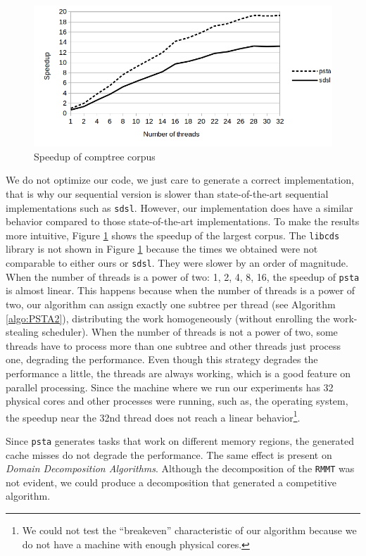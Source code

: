 \begin{figure}[ht]
  \centering
  \includegraphics[scale=0.3]{./images/Speedup.png}
  \caption{Speedup of comptree corpus}
  \label{fig:speedup} 
\end{figure}

We do not optimize our code, we just care to generate a correct
implementation, that is why our sequential version is slower than
state-of-the-art sequential implementations such as
\verb+sdsl+. However, our implementation does have a similar behavior
compared to those state-of-the-art implementations. To make the
results more intuitive, Figure \ref{fig:speedup} shows the speedup of
the largest corpus. The \verb+libcds+ library is not shown in Figure
\ref{fig:speedup} because the times we obtained were not comparable to
either ours or \verb+sdsl+. They were slower by an order of
magnitude. When the number of threads is a power of two: 1, 2, 4, 8,
16, the speedup of \verb+psta+ is almost linear. This happens because
when the number of threads is a power of two, our algorithm can assign
exactly one subtree per thread (see Algorithm \ref{algo:PSTA2}),
distributing the work homogeneously (without enrolling the
work-stealing scheduler). When the number of threads is not a power of
two, some threads have to process more than one subtree and other
threads just process one, degrading the performance. Even though this
strategy degrades the performance a little, the threads are always
working, which is a good feature on parallel processing. Since the
machine where we run our experiments has 32 physical cores and other
processes were running, such as, the operating system, the speedup
near the 32nd thread does not reach a linear behavior\footnote{We
  could not test the ``breakeven'' characteristic of our algorithm
  because we do not have a machine with enough physical cores.}. 


Since {\tt psta} generates tasks that work on different memory
regions, the generated cache misses  do
not degrade the performance. The same effect is present on
\emph{Domain Decomposition Algorithms}. Although the decomposition of
the {\tt RMMT} was not evident, we could produce a decomposition that
generated a competitive algorithm.
	
